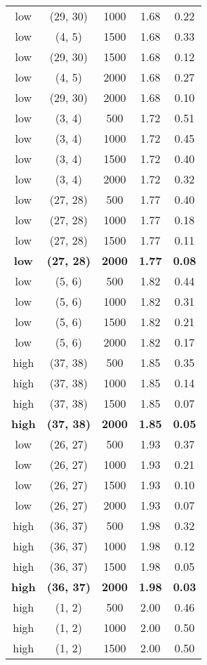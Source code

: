 \begin{tabular}{c c c c c}
low & (29, 30) &  1000 & 1.68 & 0.22 \\
low & (4, 5) &  1500 & 1.68 & 0.33 \\
low & (29, 30) &  1500 & 1.68 & 0.12 \\
low & (4, 5) &  2000 & 1.68 & 0.27 \\
low & (29, 30) &  2000 & 1.68 & 0.10 \\
low & (3, 4) &  500 & 1.72 & 0.51 \\
low & (3, 4) &  1000 & 1.72 & 0.45 \\
low & (3, 4) &  1500 & 1.72 & 0.40 \\
low & (3, 4) &  2000 & 1.72 & 0.32 \\
low & (27, 28) &  500 & 1.77 & 0.40 \\
low & (27, 28) &  1000 & 1.77 & 0.18 \\
low & (27, 28) &  1500 & 1.77 & 0.11 \\
\textbf{low} & \textbf{(27, 28)} & \textbf{ 2000} & \textbf{1.77} & \textbf{0.08} \\
low & (5, 6) &  500 & 1.82 & 0.44 \\
low & (5, 6) &  1000 & 1.82 & 0.31 \\
low & (5, 6) &  1500 & 1.82 & 0.21 \\
low & (5, 6) &  2000 & 1.82 & 0.17 \\
high & (37, 38) &  500 & 1.85 & 0.35 \\
high & (37, 38) &  1000 & 1.85 & 0.14 \\
high & (37, 38) &  1500 & 1.85 & 0.07 \\
\textbf{high} & \textbf{(37, 38)} & \textbf{ 2000} & \textbf{1.85} & \textbf{0.05} \\
low & (26, 27) &  500 & 1.93 & 0.37 \\
low & (26, 27) &  1000 & 1.93 & 0.21 \\
low & (26, 27) &  1500 & 1.93 & 0.10 \\
low & (26, 27) &  2000 & 1.93 & 0.07 \\
high & (36, 37) &  500 & 1.98 & 0.32 \\
high & (36, 37) &  1000 & 1.98 & 0.12 \\
high & (36, 37) &  1500 & 1.98 & 0.05 \\
\textbf{high} & \textbf{(36, 37)} & \textbf{ 2000} & \textbf{1.98} & \textbf{0.03} \\
high & (1, 2) &  500 & 2.00 & 0.46 \\
high & (1, 2) &  1000 & 2.00 & 0.50 \\
high & (1, 2) &  1500 & 2.00 & 0.50 \\

\end{tabular}
